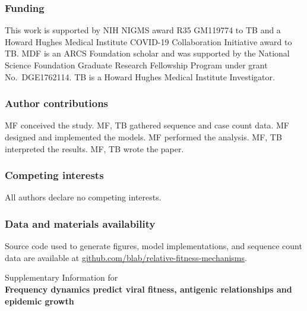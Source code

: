 \documentclass[11pt,oneside,letterpaper]{article}
\begin{document}
\subsubsection*{Funding}

This work is supported by NIH NIGMS award R35 GM119774 to TB and a Howard Hughes Medical Institute COVID-19 Collaboration Initiative award to TB.
MDF is an ARCS Foundation scholar and was supported by the National Science Foundation Graduate Research Fellowship Program under grant No.\ DGE1762114.
TB is a Howard Hughes Medical Institute Investigator.

\subsubsection*{Author contributions}
MF conceived the study.
MF, TB gathered sequence and case count data.
MF designed and implemented the models.
MF performed the analysis.
MF, TB interpreted the results.
MF, TB wrote the paper.

\subsubsection*{Competing interests}

All authors declare no competing interests.

\subsubsection*{Data and materials availability}

Source code used to generate figures, model implementations, and sequence count data are available at \href{https://github.com/blab/relative-fitness-mechanisms}{github.com/blab/relative-fitness-mechanisms}.




\newpage

\appendix

\setcounter{figure}{0}
\setcounter{table}{0}
\setcounter{page}{1}
\renewcommand{\thefigure}{S\arabic{figure}}
\renewcommand{\thetable}{S\arabic{table}}
\renewcommand{\thepage}{S\arabic{page}}
\renewcommand{\thesubsection}{S\arabic{subsection}}

\begin{center}\Large
Supplementary Information for \\
\bf Frequency dynamics predict viral fitness, antigenic relationships and epidemic growth
\end{center}
\end{document}
